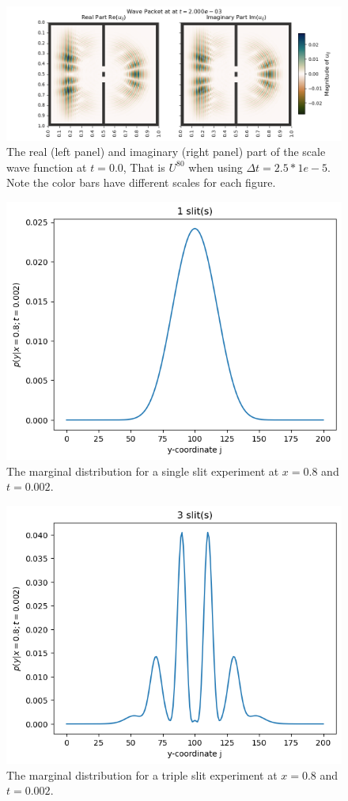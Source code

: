 \documentclass[../main_proj5.tex]{subfiles}
\begin{document}
\begin{figure}[h!]
    \centering
    \includegraphics[width=0.75\linewidth]{Project 5/figures/problem8and9_M201_Nslits2_uij_080.png}
    \caption{The real (left panel) and imaginary (right panel) part of the scale wave function at $t=0.0$, That is $U^{80}$ when using $\Delta t = 2.5*1e-5$. Note the color bars have different scales for each figure.}
    \label{fig:fig3a}
\end{figure}

\newpage

\begin{figure}
    \centering
    \includegraphics[width=0.5\linewidth]{Project 5/figures/marg_distribution_x08_t0002_Nslits1.png}
    \caption{The marginal distribution for a single slit experiment at $x=0.8$ and $t=0.002$.}
    \label{fig:marg_1slits}
\end{figure}
\begin{figure}
    \centering
    \includegraphics[width=0.5\linewidth]{Project 5/figures/marg_distribution_x08_t0002_Nslits3.png}
    \caption{The marginal distribution for a triple slit experiment at $x=0.8$ and $t=0.002$.}
    \label{fig:marg_3slits}
\end{figure}
\end{document}
